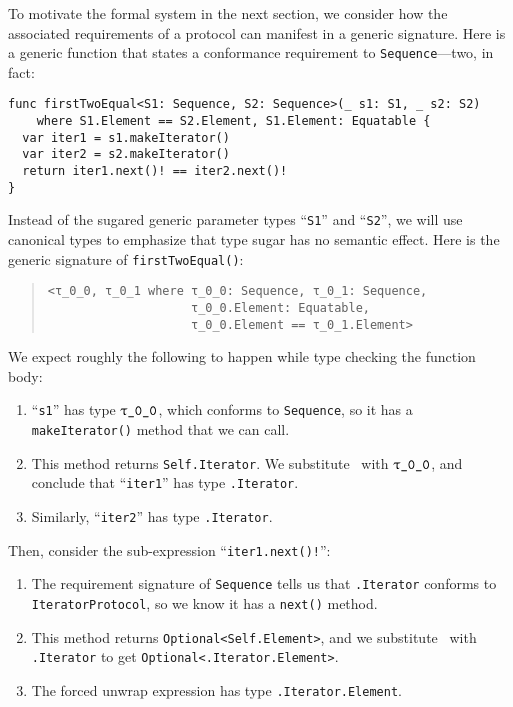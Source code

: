 \documentclass[../generics]{subfiles}
\begin{document}
\begin{example}\label{motivating derived reqs}
To motivate the formal system in the next section, we consider how the associated requirements of a protocol can manifest in a generic signature. Here is a generic function that states a conformance requirement to \texttt{Sequence}---two, in fact:
\begin{Verbatim}
func firstTwoEqual<S1: Sequence, S2: Sequence>(_ s1: S1, _ s2: S2)
    where S1.Element == S2.Element, S1.Element: Equatable {
  var iter1 = s1.makeIterator()
  var iter2 = s2.makeIterator()
  return iter1.next()! == iter2.next()!
}
\end{Verbatim}
Instead of the sugared generic parameter types ``\texttt{S1}'' and ``\texttt{S2}'', we will use canonical types to emphasize that type sugar has no semantic effect. Here is the generic signature of \texttt{firstTwoEqual()}:
\begin{quote}
\begin{verbatim}
<τ_0_0, τ_0_1 where τ_0_0: Sequence, τ_0_1: Sequence,
                    τ_0_0.Element: Equatable,
                    τ_0_0.Element == τ_0_1.Element>
\end{verbatim}
\end{quote}
We expect roughly the following to happen while type checking the function body:
\begin{enumerate}
\item ``\texttt{s1}'' has type $\rT$, which conforms to \texttt{Sequence}, so it has a \texttt{makeIterator()} method that we can call.
\item This method returns \texttt{Self.Iterator}. We substitute \tSelf\ with $\rT$, and conclude that ``\texttt{iter1}'' has type \texttt{\rT.Iterator}.
\item Similarly, ``\texttt{iter2}'' has type \texttt{\rU.Iterator}.
\end{enumerate}
Then, consider the sub-expression ``\verb|iter1.next()!|'':
\begin{enumerate}
\item The requirement signature of \texttt{Sequence} tells us that \texttt{\rT.Iterator} conforms to \texttt{IteratorProtocol}, so we know it has a \texttt{next()} method.
\item This method returns \texttt{Optional<Self.Element>}, and we substitute \tSelf\ with \texttt{\rT.Iterator} to get \texttt{Optional<\rT.Iterator.Element>}.
\item The forced unwrap expression has type \texttt{\rT.Iterator.Element}. 

\end{enumerate}
\end{example}
\end{document}
